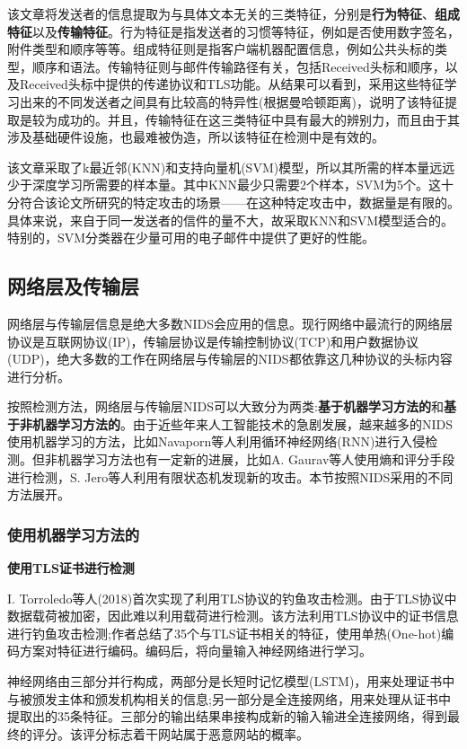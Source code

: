\documentclass[12pt]{article} %
\begin{document}
该文章将发送者的信息提取为与具体文本无关的三类特征，分别是\textbf{行为特征}、\textbf{组成特征}以及\textbf{传输特征}。行为特征是指发送者的习惯等特征，例如是否使用数字签名，附件类型和顺序等等。组成特征则是指客户端机器配置信息，例如公共头标的类型，顺序和语法。传输特征则与邮件传输路径有关，包括Received头标和顺序，以及Received头标中提供的传递协议和TLS功能。从结果可以看到，采用这些特征学习出来的不同发送者之间具有比较高的特异性(根据曼哈顿距离)，说明了该特征提取是较为成功的。并且，传输特征在这三类特征中具有最大的辨别力，而且由于其涉及基础硬件设施，也最难被伪造，所以该特征在检测中是有效的。

该文章采取了k最近邻(KNN)和支持向量机(SVM)模型，所以其所需的样本量远远少于深度学习所需要的样本量。其中KNN最少只需要2个样本，SVM为5个。这十分符合该论文所研究的特定攻击的场景——在这种特定攻击中，数据量是有限的。具体来说，来自于同一发送者的信件的量不大，故采取KNN和SVM模型适合的。特别的，SVM分类器在少量可用的电子邮件中提供了更好的性能。
\subsection{网络层及传输层}
\label{ip}

网络层与传输层信息是绝大多数NIDS会应用的信息。现行网络中最流行的网络层协议是互联网协议(IP)，传输层协议是传输控制协议(TCP)和用户数据协议(UDP)，绝大多数的工作在网络层与传输层的NIDS都依靠这几种协议的头标内容进行分析。

按照检测方法，网络层与传输层NIDS可以大致分为两类:\textbf{基于机器学习方法的}和\textbf{基于非机器学习方法的}。由于近些年来人工智能技术的急剧发展，越来越多的NIDS使用机器学习的方法，比如Navaporn等人利用循环神经网络(RNN)进行入侵检测。但非机器学习方法也有一定新的进展，比如A. Gaurav等人使用熵和评分手段进行检测，S. Jero等人利用有限状态机发现新的攻击。本节按照NIDS采用的不同方法展开。
\subsubsection{使用机器学习方法的}
\label{ml}

\textbf{使用TLS证书进行检测}

I. Torroledo等人(2018)\cite{tls}首次实现了利用TLS协议的钓鱼攻击检测。由于TLS协议中数据载荷被加密，因此难以利用载荷进行检测。该方法利用TLS协议中的证书信息进行钓鱼攻击检测;作者总结了35个与TLS证书相关的特征，使用单热(One-hot)编码方案对特征进行编码。编码后，将向量输入神经网络进行学习。

神经网络由三部分并行构成，两部分是长短时记忆模型(LSTM)，用来处理证书中与被颁发主体和颁发机构相关的信息;另一部分是全连接网络，用来处理从证书中提取出的35条特征。三部分的输出结果串接构成新的输入输进全连接网络，得到最终的评分。该评分标志着干网站属于恶意网站的概率。
\end{document}
